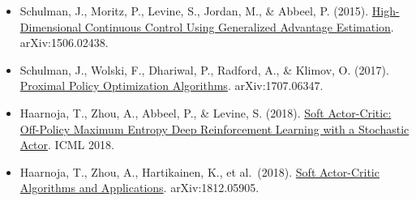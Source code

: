 \vspace{0.25em}
\begin{itemize}
\tightlist
\item
  Schulman, J., Moritz, P., Levine, S., Jordan, M., \& Abbeel, P. (2015). \href{https://arxiv.org/abs/1506.02438}{High-Dimensional Continuous Control Using Generalized Advantage Estimation}. arXiv:1506.02438.
\item
  Schulman, J., Wolski, F., Dhariwal, P., Radford, A., \& Klimov, O. (2017). \href{https://arxiv.org/abs/1707.06347}{Proximal Policy Optimization Algorithms}. arXiv:1707.06347.
\item
  Haarnoja, T., Zhou, A., Abbeel, P., \& Levine, S. (2018). \href{https://arxiv.org/abs/1801.01290}{Soft Actor-Critic: Off-Policy Maximum Entropy Deep Reinforcement Learning with a Stochastic Actor}. ICML 2018.
\item
  Haarnoja, T., Zhou, A., Hartikainen, K., et al.~(2018). \href{https://arxiv.org/abs/1812.05905}{Soft Actor-Critic Algorithms and Applications}. arXiv:1812.05905.
\end{itemize}

\clearpage
